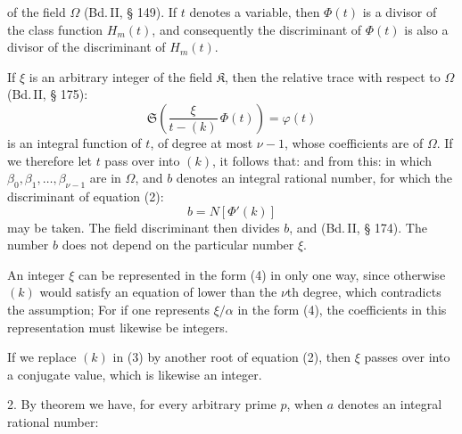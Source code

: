 
of the field $\Omega$ (Bd.\,II, § 149). If $t$ denotes a variable, then $\Phi(t)$ is a divisor of the class function $H_m(t)$, and consequently the discriminant of $\Phi(t)$ is also a divisor of the discriminant of $H_m(t)$.

If $\xi$ is an arbitrary integer of the field $\mathfrak{K}$, then the relative trace with respect to $\Omega$ (Bd.\,II, § 175):
\[
\mathfrak{S}\left(\frac{\xi}{t-(k)}\,\Phi(t)\right) = \varphi(t)
\]
is an integral function of $t$, of degree at most $\nu-1$, whose coefficients are  of $\Omega$. If we therefore let $t$ pass over into $(k)$, it follows that:
and from this:
in which $\beta_0, \beta_1, \ldots, \beta_{\nu-1}$ are  in $\Omega$, and $b$ denotes an integral rational number, for which the discriminant of equation (2):
\[
b = N[\Phi'(k)]
\]
may be taken. The field discriminant then divides $b$, and  (Bd.\,II, § 174). The number $b$ does not depend on the particular number $\xi$.

An integer $\xi$ can be represented in the form (4) in only one way, since otherwise $(k)$ would satisfy an equation of lower than the $\nu$th degree, which contradicts the assumption;  For if one represents $\xi/\alpha$ in the form (4), the coefficients in this representation must likewise be integers.

If we replace $(k)$ in (3) by another root of equation (2), then $\xi$ passes over into a conjugate value, which is likewise an integer.

2. By  theorem we have, for every arbitrary prime $p$, when $a$ denotes an integral rational number:

